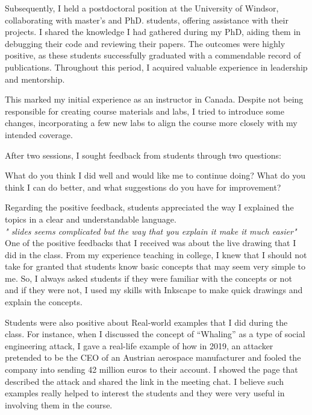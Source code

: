 Subsequently, I held a postdoctoral position at the University of Windsor, collaborating with master's and PhD. students, offering assistance with their projects. I shared the knowledge I had gathered during my PhD, aiding them in debugging their code and reviewing their papers. The outcomes were highly positive, as these students successfully graduated with a commendable record of publications. Throughout this period, I acquired valuable experience in leadership and mentorship.


This marked my initial experience as an instructor in Canada. Despite not being responsible for creating course materials and labs, I tried to introduce some changes, incorporating a few new labs to align the course more closely with my intended coverage.

After two sessions, I sought feedback from students through two questions:

    What do you think I did well and would like me to continue doing?
    What do you think I can do better, and what suggestions do you have for improvement?

Regarding the positive feedback, students appreciated the way I explained the topics in a clear and understandable language.\\


\emph{" slides seems complicated but the way that you explain it make it much easier"}\\

One of the positive feedbacks that I received was about the live drawing that I did in the class. From my experience teaching in college, I knew that I should not take for granted that students know basic concepts that may seem very simple to me. So, I always asked students if they were familiar with the concepts or not and if they were not, I used my skills with Inkscape to make quick drawings and explain the concepts.


Students were also positive about Real-world examples that I did during the class. For instance, when I discussed the concept of “Whaling” as a type of social engineering attack, I gave a real-life example of how in 2019, an attacker pretended to be the CEO of an Austrian aerospace manufacturer and fooled the company into sending 42 million euros to their account. I showed the page that described the attack and shared the link in the meeting chat. I believe such examples really helped to interest the students and they were very useful in involving them in the course.





